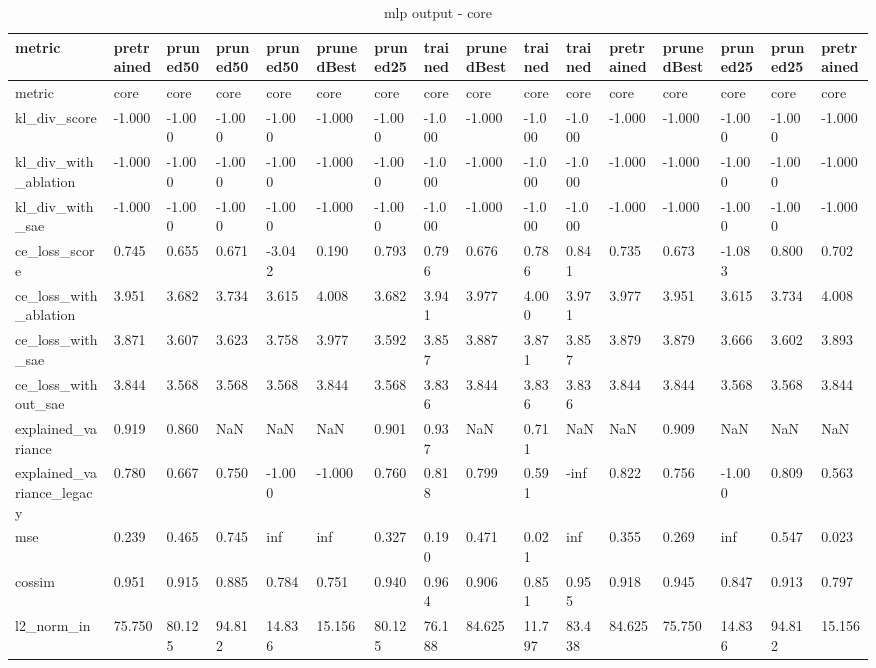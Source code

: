 \begin{table}
\caption{mlp output - core}
\label{tab:mlp_core}
\begin{tabular}{llllllllllllllll}
\toprule
metric & pretrained & pruned50 & pruned50 & pruned50 & prunedBest & pruned25 & trained & prunedBest & trained & trained & pretrained & prunedBest & pruned25 & pruned25 & pretrained \\
\midrule
metric & core & core & core & core & core & core & core & core & core & core & core & core & core & core & core \\
kl_div_score & -1.000 & -1.000 & -1.000 & -1.000 & -1.000 & -1.000 & -1.000 & -1.000 & -1.000 & -1.000 & -1.000 & -1.000 & -1.000 & -1.000 & -1.000 \\
kl_div_with_ablation & -1.000 & -1.000 & -1.000 & -1.000 & -1.000 & -1.000 & -1.000 & -1.000 & -1.000 & -1.000 & -1.000 & -1.000 & -1.000 & -1.000 & -1.000 \\
kl_div_with_sae & -1.000 & -1.000 & -1.000 & -1.000 & -1.000 & -1.000 & -1.000 & -1.000 & -1.000 & -1.000 & -1.000 & -1.000 & -1.000 & -1.000 & -1.000 \\
ce_loss_score & 0.745 & 0.655 & 0.671 & -3.042 & 0.190 & 0.793 & 0.796 & 0.676 & 0.786 & 0.841 & 0.735 & 0.673 & -1.083 & 0.800 & 0.702 \\
ce_loss_with_ablation & 3.951 & 3.682 & 3.734 & 3.615 & 4.008 & 3.682 & 3.941 & 3.977 & 4.000 & 3.971 & 3.977 & 3.951 & 3.615 & 3.734 & 4.008 \\
ce_loss_with_sae & 3.871 & 3.607 & 3.623 & 3.758 & 3.977 & 3.592 & 3.857 & 3.887 & 3.871 & 3.857 & 3.879 & 3.879 & 3.666 & 3.602 & 3.893 \\
ce_loss_without_sae & 3.844 & 3.568 & 3.568 & 3.568 & 3.844 & 3.568 & 3.836 & 3.844 & 3.836 & 3.836 & 3.844 & 3.844 & 3.568 & 3.568 & 3.844 \\
explained_variance & 0.919 & 0.860 & NaN & NaN & NaN & 0.901 & 0.937 & NaN & 0.711 & NaN & NaN & 0.909 & NaN & NaN & NaN \\
explained_variance_legacy & 0.780 & 0.667 & 0.750 & -1.000 & -1.000 & 0.760 & 0.818 & 0.799 & 0.591 & -inf & 0.822 & 0.756 & -1.000 & 0.809 & 0.563 \\
mse & 0.239 & 0.465 & 0.745 & inf & inf & 0.327 & 0.190 & 0.471 & 0.021 & inf & 0.355 & 0.269 & inf & 0.547 & 0.023 \\
cossim & 0.951 & 0.915 & 0.885 & 0.784 & 0.751 & 0.940 & 0.964 & 0.906 & 0.851 & 0.955 & 0.918 & 0.945 & 0.847 & 0.913 & 0.797 \\
l2_norm_in & 75.750 & 80.125 & 94.812 & 14.836 & 15.156 & 80.125 & 76.188 & 84.625 & 11.797 & 83.438 & 84.625 & 75.750 & 14.836 & 94.812 & 15.156 \\

\end{tabular}
\end{table}
